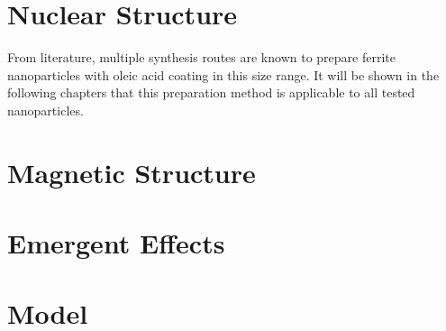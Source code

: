 \documentclass[\main/dresen_thesis.tex]{subfiles}
\begin{document}
\section{Nuclear Structure}
From literature, multiple synthesis routes are known to prepare ferrite nanoparticles with oleic acid coating in this size range. It will be shown in the following chapters that this preparation method is applicable to all tested nanoparticles.

\section{Magnetic Structure}

\section{Emergent Effects}

\section{Model}
\end{document}
